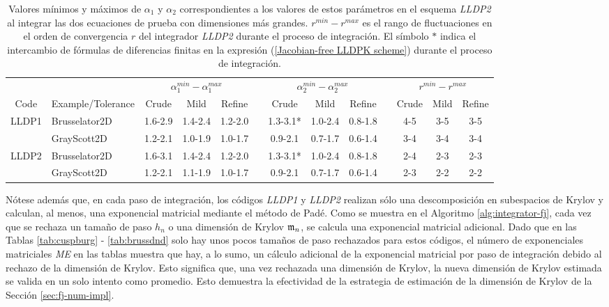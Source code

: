 \begin{table}
    \caption{Valores mínimos y máximos de $\alpha _{1}$ y $\alpha _{2}$ correspondientes a los valores de estos parámetros en el esquema \emph{LLDP2} al integrar las dos ecuaciones de prueba con dimensiones más grandes. $r^{min}-r^{max}$ es el rango de fluctuaciones en el orden de convergencia $r$ del integrador \emph{LLDP2} durante el proceso de integración. El símbolo $*$ indica el intercambio de fórmulas de diferencias finitas en la expresión (\ref{Jacobian-free LLDPK scheme}) durante el proceso de integración.}
    \label{tab:R_LLDP1_LLDP2}
    \begin{adjustbox}{width=0.95\columnwidth,center}
        \begin{tabular}{ccccccccccccc}
            &  & \multicolumn{3}{c}{$\alpha _{1}^{min}-\alpha _{1}^{max}$} &  &
            \multicolumn{3}{c}{$\alpha _{2}^{min}-\alpha _{2}^{max}$} &  &
            \multicolumn{3}{c}{$r^{min}-r^{max}$} \\ \cline{3-5}\cline{7-9}\cline{11-13}
            Code & \multicolumn{1}{l}{Example/Tolerance} & Crude & Mild & Refine &  &
            Crude & Mild & Refine &  & Crude & Mild & Refine \\ \hline
            LLDP1 & \multicolumn{1}{l}{Brusselator2D} & 1.6-2.9 & 1.4-2.4 & 1.2-2.0 &  &
            1.3-3.1* & 1.0-2.4 & 0.8-1.8 &  & 4-5 & 3-5 & 3-5 \\
            & \multicolumn{1}{l}{GrayScott2D} & 1.2-2.1 & 1.0-1.9 & 1.0-1.7 &  & 0.9-2.1
            & 0.7-1.7 & 0.6-1.4 &  & 3-4 & 3-4 & 3-4 \\
            LLDP2 & \multicolumn{1}{l}{Brusselator2D} & 1.6-3.1 & 1.4-2.4 & 1.2-2.0 &  &
            1.3-3.1* & 1.0-2.4 & 0.8-1.8 &  & 2-4 & 2-3 & 2-3 \\
            & \multicolumn{1}{l}{GrayScott2D} & 1.2-2.1 & 1.1-1.9 & 1.0-1.7 &  & 0.9-2.1
            & 0.7-1.7 & 0.6-1.4 &  & 2-3 & 2-2 & 2-2 \\ \hline
        \end{tabular}

    \end{adjustbox}
\end{table}

Nótese además que, en cada paso de integración, los códigos \emph{LLDP1} y \emph{LLDP2} realizan sólo una descomposición en subespacios de Krylov y calculan, al menos, una exponencial matricial mediante el método de Padé. Como se muestra en el Algoritmo \ref{alg:integrator-fj}, cada vez que se rechaza un tamaño de paso $ h_n $ o una dimensión de Krylov $ \mathfrak{m}_n $, se calcula una exponencial matricial adicional. Dado que en las Tablas \ref{tab:cuspburg} - \ref{tab:brussdnd} solo hay unos pocos tamaños de paso rechazados para estos códigos, el número de exponenciales matriciales  \textit{ME} en las tablas muestra que hay, a lo sumo, un cálculo adicional de la exponencial matricial por paso de integración debido al rechazo de la dimensión de Krylov. Esto significa que, una vez rechazada una dimensión de Krylov, la nueva dimensión de Krylov estimada se valida en un solo intento como promedio. Esto demuestra la efectividad de la estrategia de estimación de la dimensión de Krylov de la Sección \ref{sec:fj-num-impl}.

